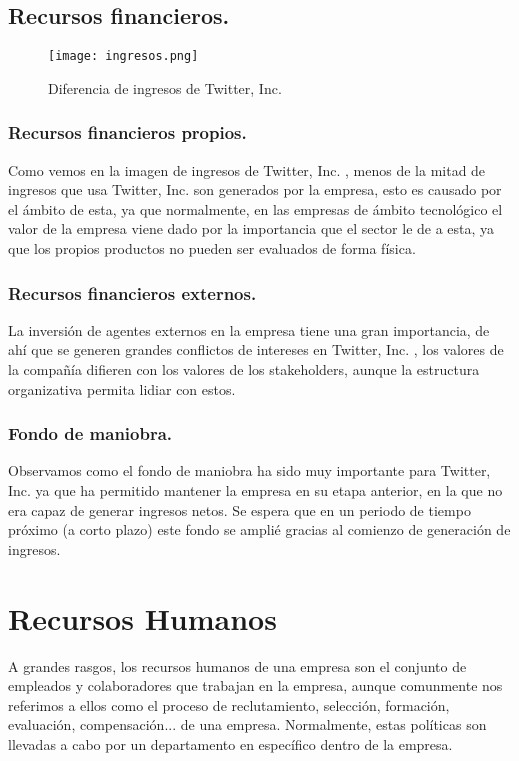 \subsection{Recursos financieros.}

\begin{figure}[!htb]
\centering
\texttt{[image: ingresos.png]}
\caption{\label{fig:frog}Diferencia de ingresos de Twitter, Inc.}
\end{figure}

\subsubsection{Recursos financieros propios.}

Como vemos en la imagen de ingresos de Twitter, Inc. , menos de la mitad de ingresos que usa Twitter, Inc. son generados  por la empresa, esto es causado por el ámbito de esta, ya que normalmente, en las empresas de ámbito tecnológico el valor de la empresa viene dado por la importancia que el sector le de a esta, ya que los propios productos no pueden ser evaluados de forma física.

\subsubsection{Recursos financieros externos.}

La inversión de agentes externos en la empresa tiene una gran importancia, de ahí que se generen grandes conflictos de intereses en Twitter, Inc. , los valores de la compañía difieren con los valores de los stakeholders, aunque la estructura organizativa permita lidiar con estos.

\subsubsection{Fondo de maniobra.}

Observamos como el fondo de maniobra ha sido muy importante para Twitter, Inc. ya que ha permitido mantener la empresa en su etapa anterior, en la que no era capaz de generar ingresos netos. Se espera que en un periodo de tiempo próximo (a corto plazo) este fondo se amplié gracias al comienzo de generación de ingresos.

\section{Recursos Humanos}

A grandes rasgos, los recursos humanos de una empresa son el conjunto de empleados y colaboradores que
trabajan en la empresa, aunque comunmente nos referimos a ellos como el proceso de reclutamiento, selección, formación, evaluación, compensación... de una empresa. Normalmente, estas políticas son llevadas a cabo por un departamento en específico dentro de la empresa.

